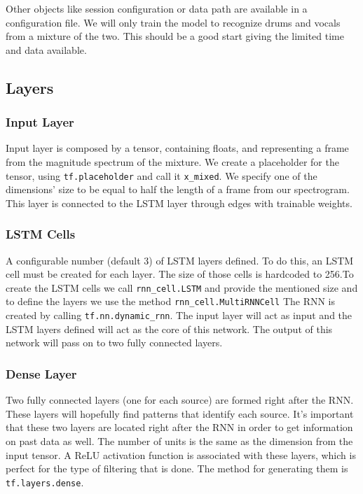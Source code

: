 \documentclass[../Thesis.tex]{subfiles}
\begin{document}
Other objects like session configuration or data path are available in a configuration file. 
We will only train the model to recognize drums and vocals from a mixture of the two. This should be a good start giving the limited time and data available. 


\subsection {Layers}
\subsubsection {Input Layer}

Input layer is composed by a tensor, containing floats, and representing a frame from the magnitude spectrum of the mixture. We create a placeholder for the tensor, using \texttt{tf.placeholder} and call it \texttt{x\_mixed}. We specify one of the dimensions’ size to be equal to half the length of a frame from our spectrogram. This layer is connected to the LSTM layer through edges with trainable weights.

\subsubsection {LSTM Cells}

A configurable number (default 3) of LSTM layers defined. To do this, an LSTM cell must be created for each layer. The size of those cells is hardcoded to 256.To create the LSTM cells we call \texttt{rnn\_cell.LSTM} and provide the mentioned size and to define the layers we use the method \texttt{rnn\_cell.MultiRNNCell} The RNN is created by calling \texttt{tf.nn.dynamic\_rnn}. The input layer will act as input and the LSTM layers defined will act as the core of this network. The output of this network will pass on to two fully connected layers.

\subsubsection {Dense Layer}

Two fully connected layers (one for each source) are formed right after the RNN. These layers will hopefully find patterns that identify each source. It’s important that these two layers are located right after the RNN in order to get information on past data as well.  The number of units is the same as the dimension from the input tensor. A ReLU activation function is associated with these layers, which is perfect for the type of filtering that is done. The method for generating them is \texttt{tf.layers.dense}.
\end{document}
